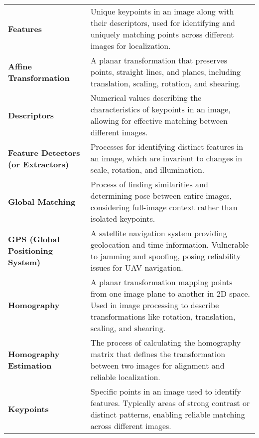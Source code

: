 \begingroup
\renewcommand{\arraystretch}{1.2}
\begin{tabularx}{\textwidth}{@{}p{2.5cm}L}

    \textbf{Features} & 
    Unique keypoints in an image along with their descriptors, used for identifying and uniquely matching points across different images for localization. \\
    
    \textbf{Affine Transformation} & 
    A planar transformation that preserves points, straight lines, and planes, including translation, scaling, rotation, and shearing. \\

    \textbf{Descriptors} & 
    Numerical values describing the characteristics of keypoints in an image, allowing for effective matching between different images. \\

    \textbf{Feature Detectors (or Extractors)} & 
    Processes for identifying distinct features in an image, which are invariant to changes in scale, rotation, and illumination. \\

    \textbf{Global Matching} & 
    Process of finding similarities and determining pose between entire images, considering full-image context rather than isolated keypoints. \\

    \textbf{GPS (Global Positioning System)} & 
    A satellite navigation system providing geolocation and time information. Vulnerable to jamming and spoofing, posing reliability issues for UAV navigation. \\

    \textbf{Homography} & 
    A planar transformation mapping points from one image plane to another in 2D space. Used in image processing to describe transformations like rotation, translation, scaling, and shearing. \\

    \textbf{Homography Estimation} & 
    The process of calculating the homography matrix that defines the transformation between two images for alignment and reliable localization. \\

    \textbf{Keypoints} & 
    Specific points in an image used to identify features. Typically areas of strong contrast or distinct patterns, enabling reliable matching across different images. \\


\end{tabularx}
